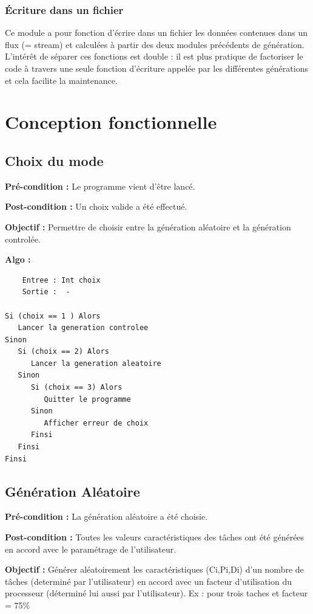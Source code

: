 			\subsubsection{Écriture dans un fichier}
				Ce module a pour fonction d’écrire dans un fichier les données contenues dans un flux (= stream)  et calculées à partir des deux modules précédents de génération. L’intérêt de séparer ces fonctions est double : il est plus pratique de factoriser le code à travers une seule fonction d’écriture appelée par les différentes générations et cela facilite la maintenance.


	\section{Conception fonctionnelle}

		\subsection{Choix du mode}
			\textbf{Pré-condition :} Le programme vient d’être lancé.
			
			\textbf{Post-condition :} Un choix valide a été effectué.
			
			\textbf{Objectif :} Permettre de choisir entre la génération aléatoire et la génération controlée.
			
			\textbf{Algo :}
			\begin{lstlisting} 
	Entree : Int choix
	Sortie :  -

Si (choix == 1 ) Alors
   Lancer la generation controlee
Sinon
   Si (choix == 2) Alors
	  Lancer la generation aleatoire 
   Sinon
	  Si (choix == 3) Alors
	     Quitter le programme
	  Sinon
	     Afficher erreur de choix 
	  Finsi
   Finsi
Finsi
		\end{lstlisting} 

	\newpage
	\subsection{Génération Aléatoire}
		\textbf{Pré-condition :} La génération aléatoire a été choisie.
		
		\textbf{Post-condition :} Toutes les valeurs caractéristiques des tâches ont été générées en accord avec le paramétrage de l’utilisateur.

		\textbf{Objectif :} Générer aléatoirement les caractéristiques (Ci,Pi,Di) d’un nombre de tâches (determiné par l’utilisateur) en accord avec un facteur d’utilisation du processeur (déterminé lui aussi par l’utilisateur).
		Ex : pour trois taches et facteur = 75\% \\ 


